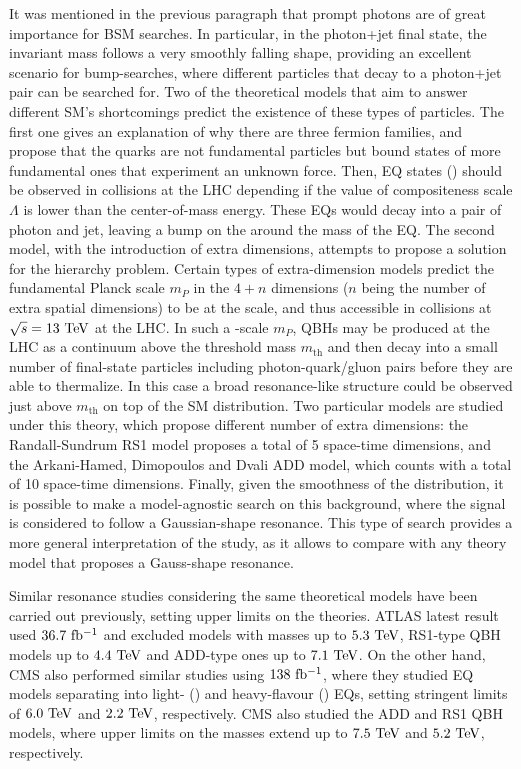 It was mentioned in the previous paragraph that prompt photons are of great importance for \ac{BSM} searches. In particular, in the photon+jet final state, the invariant mass follows a very smoothly falling shape, providing an excellent scenario for bump-searches, where different particles that decay to a photon+jet pair can be searched for. Two of the theoretical models that aim to answer different \ac{SM}'s shortcomings predict the existence of these types of particles. The first one gives an explanation of why there are three fermion families, and propose that the quarks are not fundamental particles but bound states of more fundamental ones that experiment an unknown force. Then, \ac{EQ} states (\qstar) should be observed in \pp collisions at the \ac{LHC} depending if the value of compositeness scale \(\Lambda\) is lower than the center-of-mass energy. These \acp{EQ} would decay into a pair of photon and jet, leaving a bump on the \myj around the mass of the \ac{EQ}. The second model, with the introduction of extra dimensions, attempts to propose a solution for the hierarchy problem. Certain types of extra-dimension models predict the fundamental Planck scale \(m_P\) in the \(4 + n\) dimensions (\(n\) being the number of extra spatial dimensions) to be at the \tev scale, and thus accessible in \pp collisions at \(\sqs=13~\tev\) at the \ac{LHC}.
In such a \TeV-scale \(m_P\), \acp{QBH} may be produced at the \ac{LHC} as a continuum above the threshold mass \(m_{\text{th}}\) and then decay into a small number of final-state particles including photon-quark/gluon pairs before they are able to thermalize. In this case a broad resonance-like structure could be observed just above \(m_{\text{th}}\) on top of the \ac{SM} \myj distribution. Two particular models are studied under this theory, which propose different number of extra dimensions: the Randall-Sundrum RS1 model proposes a total of 5 space-time dimensions, and the Arkani-Hamed, Dimopoulos and Dvali ADD model, which counts with a total of 10 space-time dimensions.
Finally, given the smoothness of the \myj distribution, it is possible to make a model-agnostic search on this background, where the signal is considered to follow a Gaussian-shape resonance. This type of search provides a more general interpretation of the study, as it allows to compare with any theory model that proposes a Gauss-shape resonance.


Similar \gammajet resonance studies considering the same theoretical models have been carried out previously, setting upper limits on the theories. \ac{ATLAS} latest result used \(36.7~\ifb\) and excluded \qstar models with masses up to \(5.3~\tev\), RS1-type \ac{QBH} models up to \(4.4~\tev\) and ADD-type ones up to \(7.1~\tev\). On the other hand, \ac{CMS} also performed similar studies using \(138~\ifb\), where they studied \ac{EQ} models separating into light- (\qstar) and heavy-flavour (\bstar) \acp{EQ}, setting stringent limits of \(6.0~\tev\) and \(2.2~\tev\), respectively. \ac{CMS} also studied the ADD and RS1 \ac{QBH} models, where upper limits on the masses extend up to \(7.5~\tev\) and \(5.2~\tev\), respectively.

